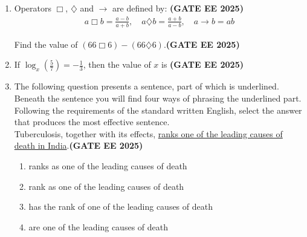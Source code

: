 \documentclass[journal,12pt,onecolumn]{IEEEtran}
\theoremstyle{remark}
\begin{document}
\begin{enumerate}
\item Operators $\Box$, $\diamondsuit$ and $\rightarrow$ are defined by:  \hfill \textbf{(GATE EE 2025)}
\begin{align}
a \Box b = \frac{a-b}{a+b}, \quad 
a \diamondsuit b = \frac{a+b}{a-b}, \quad 
a \rightarrow b = ab
\end{align}

Find the value of $(66 \Box 6) - (66 \diamondsuit 6)$.\hfill \textbf{(GATE EE 2025)}
\begin{enumerate}
\end{enumerate}


\item If $\log_x \left(\frac{5}{7}\right) = -\frac{1}{3}$, then the value of $x$ is  \hfill \textbf{(GATE EE 2025)}
\begin{enumerate}
\end{enumerate}


\item The following question presents a sentence, part of which is underlined. Beneath the sentence you will find four ways of phrasing the underlined part. Following the requirements of the standard written English, select the answer that produces the most effective sentence.\\

Tuberculosis, together with its effects, \underline{ranks one of the leading causes of death in India}.\hfill \textbf{(GATE EE 2025)}
\begin{enumerate}
    \item ranks as one of the leading causes of death
    \item  rank as one of the leading causes of death
    \item has the rank of one of the leading causes of death
    \item are one of the leading causes of death
\end{enumerate}






\end{enumerate}
\end{document}
